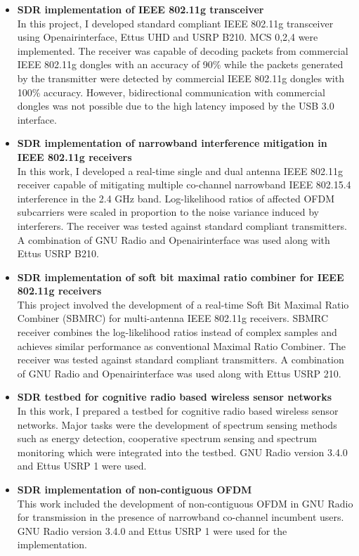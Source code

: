 \documentclass[res,10pt]{article}
\newlength{\outerbordwidth}
\newcommand{\resheading}[1]{\vspace{8pt}
  \parbox{\textwidth}{\setlength{\FrameSep}{\outerbordwidth}
    \begin{shaded}
\setlength{\fboxsep}{0pt}\framebox[\textwidth][l]{\setlength{\fboxsep}{4pt}\fcolorbox{shadecolorB}{shadecolorB}{\textbf{\sffamily{\mbox{~}\makebox[6.762in][l]{\large #1} \vphantom{p\^{E}}}}}}
    \end{shaded}
  }\vspace{-5pt}
}
\begin{document}
\resheading{SDR Implementations}
\begin{itemize}
	\item \textbf{SDR implementation of IEEE 802.11g transceiver} \\
	In this project, I developed standard compliant IEEE 802.11g transceiver using Openairinterface, Ettus UHD and USRP B210. MCS 0,2,4 were implemented. The receiver was capable of decoding packets from commercial IEEE 802.11g dongles with an accuracy of 90\% while the packets generated by the transmitter were detected by commercial IEEE 802.11g dongles with 100\% accuracy. However, bidirectional communication with commercial dongles was not possible due to the high latency imposed by the USB 3.0 interface.  	
	\item \textbf{SDR implementation of narrowband interference mitigation in IEEE 802.11g receivers} \\
	In this work, I developed a real-time single and dual antenna IEEE 802.11g receiver capable of mitigating multiple co-channel narrowband IEEE 802.15.4 interference in the 2.4 GHz band. Log-likelihood ratios of affected OFDM subcarriers were scaled in proportion to the noise variance induced by interferers. The receiver was tested against standard compliant transmitters. A combination of GNU Radio and Openairinterface was used along with Ettus USRP B210.
	\item \textbf{SDR implementation of soft bit maximal ratio combiner for IEEE 802.11g receivers}\\
	This project involved the development of a real-time Soft Bit Maximal Ratio Combiner (SBMRC) for multi-antenna IEEE 802.11g receivers. SBMRC receiver combines the log-likelihood ratios instead of complex samples and achieves similar performance as conventional Maximal Ratio Combiner. The receiver was tested against standard compliant transmitters. A combination of GNU Radio and Openairinterface was used along with Ettus USRP 210. 
	\item \textbf{SDR testbed for cognitive radio based wireless sensor networks}\\
	In this work, I prepared a testbed for cognitive radio based wireless sensor networks. Major tasks were the development of spectrum sensing methods such as energy detection, cooperative spectrum sensing and spectrum monitoring which were integrated into the testbed. GNU Radio version 3.4.0 and Ettus USRP 1 were used.   
	\item \textbf{SDR implementation of non-contiguous OFDM}\\
	This work included the development of non-contiguous OFDM in GNU Radio for transmission in the presence of narrowband co-channel incumbent users. GNU Radio version 3.4.0 and Ettus USRP 1 were used for the implementation.   
\end{itemize} 
\end{document}
